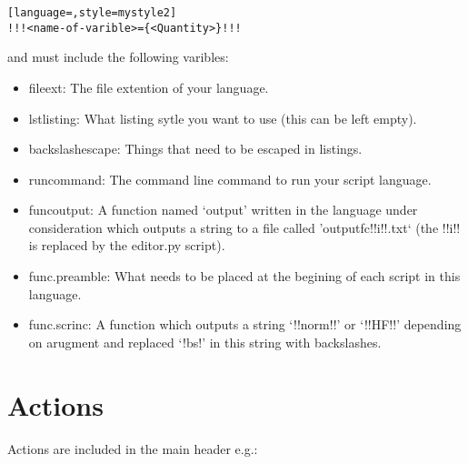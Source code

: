 \documentclass[a4paper,12pt,twocolum]{article}
\begin{document}

\begin{lstlisting}[language=,style=mystyle2]
!!!<name-of-varible>={<Quantity>}!!!
\end{lstlisting}
          
and must include the following varibles:
\begin{itemize}
\item file\textunderscore ext: The file extention of your language.
\item lstlisting: What listing sytle you want to use (this can be left empty).
\item back\textunderscore slash\textunderscore escape: Things that need to be escaped in listings.
\item run\textunderscore command: The command line command to run your script language.
\item func\textunderscore output: A function named `output' written in the language under consideration which outputs a string to a file called 'outputfc\textunderscore !!i!!.txt` (the !!i!! is replaced by the editor.py script).
\item func.preamble: What needs to be placed at the begining of each script in this language.
\item func.scrinc: A function which outputs a string `!!norm!!' or `!!HF!!' depending on arugment and replaced `!bs!' in this string with backslashes.
\end{itemize}
\section{Actions}
Actions are included in the main header e.g.:
\end{document}
